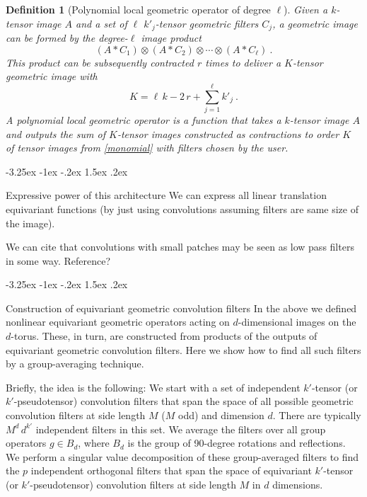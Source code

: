\documentclass{article}
\makeatletter
\theoremstyle{plain}
\newtheorem{definition}{Definition}
\renewcommand\section{\@startsection {section}{1}{\z@}%
  {-3.25ex \@plus -1ex \@minus -.2ex}%
  {1.5ex \@plus .2ex}%
  {\raggedright\normalfont\large\bfseries}}
\makeatother
\begin{document}
\begin{definition}[Polynomial local geometric operator of degree $\ell$]
Given a $k$-tensor image $A$ and a set of $\ell$ $k'_j$-tensor geometric filters $C_j$, a geometric image can be formed by the degree-$\ell$ image product
\begin{equation}
    (A\ast C_1) \otimes (A\ast C_2) \otimes \cdots \otimes (A\ast C_\ell) ~. \label{monomial}
\end{equation}
This product can be subsequently contracted $r$ times to deliver a $K$-tensor geometric image with
\begin{equation}
    K = \ell\,k - 2\,r + \sum_{j=1}^\ell k'_j ~.
\end{equation}
A polynomial local geometric operator is a function that takes a $k$-tensor image $A$ and outputs the sum of $K$-tensor images constructed as contractions to order $K$ of tensor images from \eqref{monomial} with filters chosen by the user. 
\end{definition}

\section{Expressive power of this architecture}
We can express all linear translation equivariant functions (by just using convolutions assuming filters are same size of the image). 

We can cite that convolutions with small patches may be seen as low pass filters in some way. Reference?



\section{Construction of equivariant geometric convolution filters}
In the above we defined nonlinear equivariant geometric operators acting on $d$-dimensional images on the $d$-torus.
These, in turn, are constructed from products of the outputs of equivariant geometric convolution filters.
Here we show how to find all such filters by a group-averaging technique.

Briefly, the idea is the following:
We start with a set of independent $k'$-tensor (or $k'$-pseudotensor) convolution filters that span the space of all possible geometric convolution filters at side length $M$ ($M$ odd) and dimension $d$.
There are typically $M^d\,d^{k'}$ independent filters in this set.
We average the filters over all group operators $g\in B_d$, where $B_d$ is the group of 90-degree rotations and reflections.
We perform a singular value decomposition of these group-averaged filters to find the $p$ independent orthogonal filters that span the space of equivariant $k'$-tensor (or $k'$-pseudotensor) convolution filters at side length $M$ in $d$ dimensions.
\end{document}
